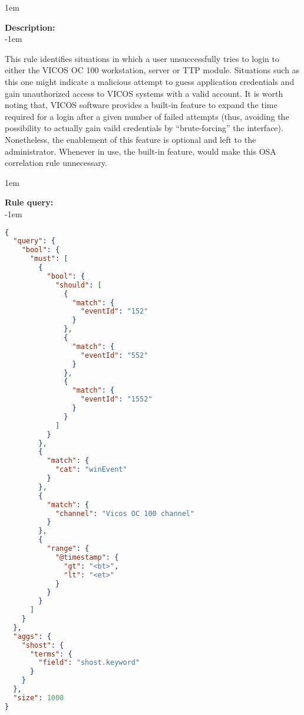 \openup 1em

{\bf Description:} \\

\openup -1em
\vspace{-2em}


This rule identifies situations in which a user unsuccessfully tries to login to either the VICOS OC 100 workstation, server or TTP module. Situations such as this one might indicate a malicious attempt to guess application credentials and gain unauthorized access to VICOS systems with a valid account. It is worth noting that, VICOS software provides a built-in feature to expand the time required for a login after a given number of failed attempts (thus, avoiding the possibility to actually gain vaild credentials by ``brute-forcing'' the interface). Nonetheless, the enablement of this feature is optional and left to the administrator. Whenever in use, the built-in feature, would make this OSA correlation rule unnecessary.

\openup 1em

{\bf Rule query:} \\

\openup -1em
\vspace{-2em}

\begin{lstlisting}[language=json,firstnumber=1]
{
  "query": {
    "bool": {
      "must": [
        {
          "bool": {
            "should": [
              {
                "match": {
                  "eventId": "152"
                }
              },
              {
                "match": {
                  "eventId": "552"
                }
              },
              {
                "match": {
                  "eventId": "1552"
                }
              }
            ]
          }
        },
        {
          "match": {
            "cat": "winEvent"
          }
        },
        {
          "match": {
            "channel": "Vicos OC 100 channel"
          }
        },
        {
          "range": {
            "@timestamp": {
              "gt": "<bt>",
              "lt": "<et>"
            }
          }
        }
      ]
    }
  },
  "aggs": {
    "shost": {
      "terms": {
        "field": "shost.keyword"
      }
    }
  },
  "size": 1000
}
\end{lstlisting}

